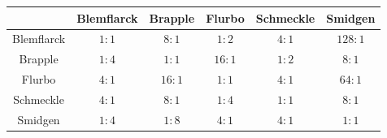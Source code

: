 \documentclass[a4paper,12pt]{article}
\begin{document}
\begin{enumerate}
        \begin{table}[h]
            \centering
            \begin{tabular}{|c|c|c|c|c|c|}
                \hline
                    & Blemflarck & Brapple & Flurbo & Schmeckle & Smidgen \\ \hline
                Blemflarck & $1:1$ & $8:1$ & $1:2$ & $4:1$ & $128:1$ \\ \hline
                Brapple & $1:4$ & $1:1$ & $16:1$ & $1:2$ & $8:1$ \\ \hline
                Flurbo & $4:1$ & $16:1$ & $1:1$ & $4:1$ & $64:1$ \\ \hline
                Schmeckle & $4:1$ & $8:1$ & $1:4$ & $1:1$ & $8:1$ \\ \hline
                Smidgen & $1:4$ & $1:8$ & $4:1$ & $4:1$ & $1:1$ \\ \hline

            \end{tabular}
        \end{table}
    \end{enumerate}
\end{document}
